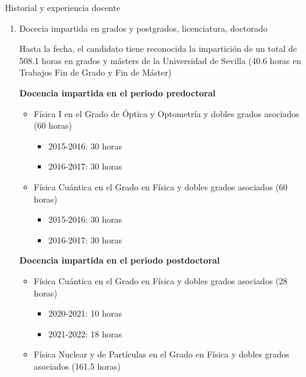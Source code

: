 \documentclass{resume2} %
\begin{document}

\begin{rSection}{Historial y experiencia docente}

\begin{enumerate}[label=\alph*.]
\item Docecia impartida en grados y postgrados, licenciatura, doctorado

Hasta la fecha, el candidato tiene reconocida la impartici\'on de un total de 508.1 horas en grados y m\'asters de la Universidad de Sevilla (40.6 horas en Trabajos Fin de Grado y Fin de M\'aster)

{\bf Docencia impartida en el periodo predoctoral}

\begin{itemize}
\item F\'isica I en el Grado de \'Optica y Optometr\'ia y dobles grados asociados (60 horas)

\begin{itemize}
\item 2015-2016: 30 horas
\item 2016-2017: 30 horas
\end{itemize}

\item F\'isica Cu\'antica en el Grado en F\'isica y dobles grados asociados (60 horas)

\begin{itemize}
\item 2015-2016: 30 horas
\item 2016-2017: 30 horas
\end{itemize}

\end{itemize}

{\bf Docencia impartida en el periodo postdoctoral}

\begin{itemize}
\item F\'isica Cu\'antica en el Grado en F\'isica y dobles grados asociados (28 horas)

\begin{itemize}
\item 2020-2021: 10 horas
\item 2021-2022: 18 horas
\end{itemize}

\item F\'isica Nuclear y de Part\'iculas en el Grado en F\'isica y dobles grados asociados (161.5 horas)


\end{itemize}
\end{enumerate}
\end{rSection}
\end{document}
